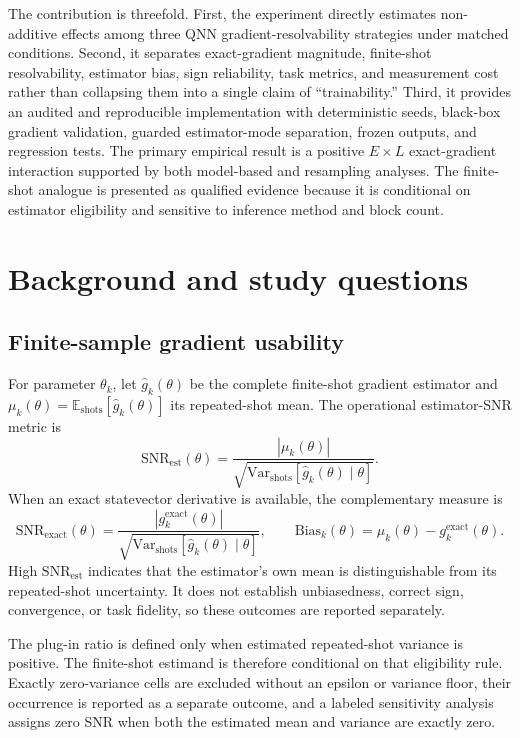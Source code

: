 \documentclass[pdflatex,sn-basic,Numbered]{sn-jnl}
\newcommand{\snrest}{\mathrm{SNR}_{\mathrm{est}}}
\newcommand{\snrexact}{\mathrm{SNR}_{\mathrm{exact}}}
\newcommand{\vshots}{\mathrm{Var}_{\mathrm{shots}}}
\begin{document}
The contribution is threefold. First, the experiment directly estimates non-additive effects among three QNN gradient-resolvability strategies under matched conditions. Second, it separates exact-gradient magnitude, finite-shot resolvability, estimator bias, sign reliability, task metrics, and measurement cost rather than collapsing them into a single claim of ``trainability.'' Third, it provides an audited and reproducible implementation with deterministic seeds, black-box gradient validation, guarded estimator-mode separation, frozen outputs, and regression tests. The primary empirical result is a positive $E\times L$ exact-gradient interaction supported by both model-based and resampling analyses. The finite-shot analogue is presented as qualified evidence because it is conditional on estimator eligibility and sensitive to inference method and block count.

\section{Background and study questions}

\subsection{Finite-sample gradient usability}

For parameter $\theta_k$, let $\hat g_k(\theta)$ be the complete finite-shot gradient estimator and $\mu_k(\theta)=\mathbb{E}_{\mathrm{shots}}[\hat g_k(\theta)]$ its repeated-shot mean. The operational estimator-SNR metric is
\[
\snrest(\theta)=
\frac{|\mu_k(\theta)|}
{\sqrt{\vshots[\hat g_k(\theta)\mid\theta]}}.
\]
When an exact statevector derivative is available, the complementary measure is
\[
\snrexact(\theta)=
\frac{|g_k^{\mathrm{exact}}(\theta)|}
{\sqrt{\vshots[\hat g_k(\theta)\mid\theta]}},
\qquad
\mathrm{Bias}_k(\theta)=\mu_k(\theta)-g_k^{\mathrm{exact}}(\theta).
\]
High $\snrest$ indicates that the estimator's own mean is distinguishable from its repeated-shot uncertainty. It does not establish unbiasedness, correct sign, convergence, or task fidelity, so these outcomes are reported separately.

The plug-in ratio is defined only when estimated repeated-shot variance is positive. The finite-shot estimand is therefore conditional on that eligibility rule. Exactly zero-variance cells are excluded without an epsilon or variance floor, their occurrence is reported as a separate outcome, and a labeled sensitivity analysis assigns zero SNR when both the estimated mean and variance are exactly zero.
\end{document}
